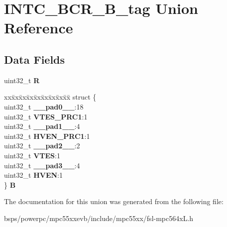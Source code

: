 \hypertarget{unionINTC__BCR__32B__tag}{}\section{I\+N\+T\+C\+\_\+\+B\+C\+R\+\_\+B\+\_\+tag Union Reference}
\label{unionINTC__BCR__32B__tag}
\subsection*{Data Fields}
\begin{DoxyCompactItemize}
\item 
\mbox{\label{unionINTC__BCR__32B__tag_adb8d359b9b58354a3eccfb4033ea7a7b}} 
uint32\+\_\+t {\bfseries R}
\item 
\mbox{\label{unionINTC__BCR__32B__tag_a29cebc470fa7174846412587f10784d3}} 
\begin{tabbing}
xx\=xx\=xx\=xx\=xx\=xx\=xx\=xx\=xx\=\kill
struct \{\\
\>uint32\_t {\bfseries \_\_pad0\_\_}:18\\
\>uint32\_t {\bfseries VTES\_PRC1}:1\\
\>uint32\_t {\bfseries \_\_pad1\_\_}:4\\
\>uint32\_t {\bfseries HVEN\_PRC1}:1\\
\>uint32\_t {\bfseries \_\_pad2\_\_}:2\\
\>uint32\_t {\bfseries VTES}:1\\
\>uint32\_t {\bfseries \_\_pad3\_\_}:4\\
\>uint32\_t {\bfseries HVEN}:1\\
\} {\bfseries B}\\

\end{tabbing}\end{DoxyCompactItemize}


The documentation for this union was generated from the following file\+:\begin{DoxyCompactItemize}
\item 
bsps/powerpc/mpc55xxevb/include/mpc55xx/fsl-\/mpc564x\+L.\+h\end{DoxyCompactItemize}
